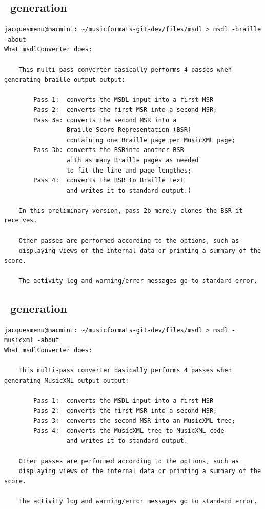   \subsection{\braille\ generation}

\begin{lstlisting}[language=Terminal]
jacquesmenu@macmini: ~/musicformats-git-dev/files/msdl > msdl -braille -about
What msdlConverter does:

    This multi-pass converter basically performs 4 passes when generating braille output output:

        Pass 1:  converts the MSDL input into a first MSR
        Pass 2:  converts the first MSR into a second MSR;
        Pass 3a: converts the second MSR into a
                 Braille Score Representation (BSR)
                 containing one Braille page per MusicXML page;
        Pass 3b: converts the BSRinto another BSR
                 with as many Braille pages as needed
                 to fit the line and page lengthes;
        Pass 4:  converts the BSR to Braille text
                 and writes it to standard output.)

    In this preliminary version, pass 2b merely clones the BSR it receives.

    Other passes are performed according to the options, such as
    displaying views of the internal data or printing a summary of the score.

    The activity log and warning/error messages go to standard error.
\end{lstlisting}

  \subsection{\mxml\ generation}

\begin{lstlisting}[language=Terminal]
jacquesmenu@macmini: ~/musicformats-git-dev/files/msdl > msdl -musicxml -about
What msdlConverter does:

    This multi-pass converter basically performs 4 passes when generating MusicXML output output:

        Pass 1:  converts the MSDL input into a first MSR
        Pass 2:  converts the first MSR into a second MSR;
        Pass 3:  converts the second MSR into an MusicXML tree;
        Pass 4:  converts the MusicXML tree to MusicXML code
                 and writes it to standard output.

    Other passes are performed according to the options, such as
    displaying views of the internal data or printing a summary of the score.

    The activity log and warning/error messages go to standard error.

\end{lstlisting}

